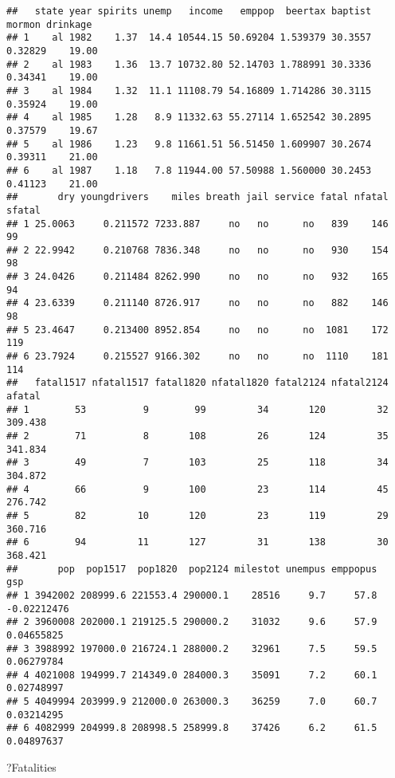 \documentclass[]{article}
\newenvironment{Shaded}{\begin{snugshade}}{\end{snugshade}}
\newcommand{\NormalTok}[1]{#1}
\begin{document}
\begin{verbatim}
##   state year spirits unemp   income   emppop  beertax baptist  mormon drinkage
## 1    al 1982    1.37  14.4 10544.15 50.69204 1.539379 30.3557 0.32829    19.00
## 2    al 1983    1.36  13.7 10732.80 52.14703 1.788991 30.3336 0.34341    19.00
## 3    al 1984    1.32  11.1 11108.79 54.16809 1.714286 30.3115 0.35924    19.00
## 4    al 1985    1.28   8.9 11332.63 55.27114 1.652542 30.2895 0.37579    19.67
## 5    al 1986    1.23   9.8 11661.51 56.51450 1.609907 30.2674 0.39311    21.00
## 6    al 1987    1.18   7.8 11944.00 57.50988 1.560000 30.2453 0.41123    21.00
##       dry youngdrivers    miles breath jail service fatal nfatal sfatal
## 1 25.0063     0.211572 7233.887     no   no      no   839    146     99
## 2 22.9942     0.210768 7836.348     no   no      no   930    154     98
## 3 24.0426     0.211484 8262.990     no   no      no   932    165     94
## 4 23.6339     0.211140 8726.917     no   no      no   882    146     98
## 5 23.4647     0.213400 8952.854     no   no      no  1081    172    119
## 6 23.7924     0.215527 9166.302     no   no      no  1110    181    114
##   fatal1517 nfatal1517 fatal1820 nfatal1820 fatal2124 nfatal2124  afatal
## 1        53          9        99         34       120         32 309.438
## 2        71          8       108         26       124         35 341.834
## 3        49          7       103         25       118         34 304.872
## 4        66          9       100         23       114         45 276.742
## 5        82         10       120         23       119         29 360.716
## 6        94         11       127         31       138         30 368.421
##       pop  pop1517  pop1820  pop2124 milestot unempus emppopus         gsp
## 1 3942002 208999.6 221553.4 290000.1    28516     9.7     57.8 -0.02212476
## 2 3960008 202000.1 219125.5 290000.2    31032     9.6     57.9  0.04655825
## 3 3988992 197000.0 216724.1 288000.2    32961     7.5     59.5  0.06279784
## 4 4021008 194999.7 214349.0 284000.3    35091     7.2     60.1  0.02748997
## 5 4049994 203999.9 212000.0 263000.3    36259     7.0     60.7  0.03214295
## 6 4082999 204999.8 208998.5 258999.8    37426     6.2     61.5  0.04897637
\end{verbatim}

\begin{Shaded}
\begin{Highlighting}[]
\NormalTok{?Fatalities}
\end{Highlighting}
\end{Shaded}
\end{document}
